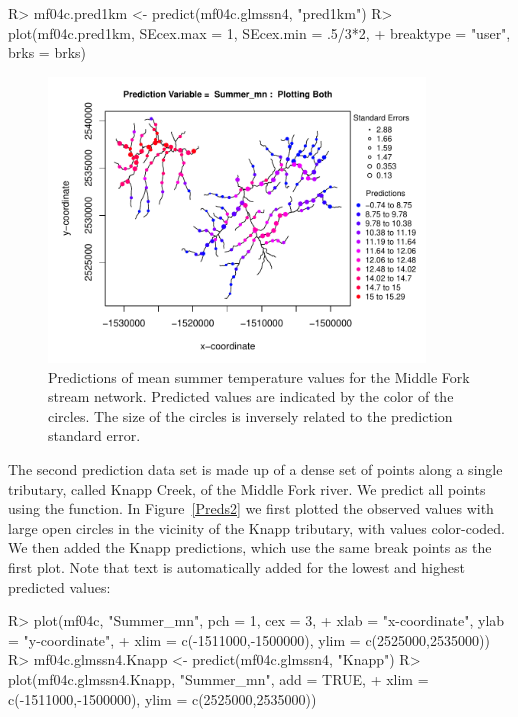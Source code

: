 \documentclass[nojss]{jss}
\renewenvironment{Schunk}{\vspace{\topsep}}{\vspace{\topsep}}
\begin{document}
\begin{Schunk}
\begin{Sinput}
R> mf04c.pred1km <- predict(mf04c.glmssn4, "pred1km")
R> plot(mf04c.pred1km, SEcex.max = 1, SEcex.min = .5/3*2,
+       breaktype = "user", brks = brks)
\end{Sinput}
\end{Schunk}

\begin{figure}[htbp]
  \begin{center}
    \includegraphics[keepaspectratio=true, width = 100mm]{Figures/jss984Fig-Preds1}
    \caption{Predictions of mean summer temperature values for the Middle Fork stream network. Predicted
      values are indicated by the color of the circles. The size of
      the circles is inversely related to the prediction standard
      error.}\label{Preds1}
  \end{center}
\end{figure}

The second prediction data set is made up of a dense set of points
along a single tributary, called Knapp Creek, of the Middle Fork
river. We predict all points using the  function. In
Figure~\ref{Preds2} we first plotted the observed values with large
open circles in the vicinity of the Knapp tributary, with values
color-coded. We then added the Knapp predictions, which use the same
break points as the first plot. Note that text is automatically added
for the lowest and highest predicted values:

\begin{Schunk}
\begin{Sinput}
R> plot(mf04c, "Summer_mn", pch = 1, cex = 3,
+     xlab = "x-coordinate", ylab = "y-coordinate",
+     xlim = c(-1511000,-1500000), ylim = c(2525000,2535000))
R> mf04c.glmssn4.Knapp <- predict(mf04c.glmssn4, "Knapp")
R> plot(mf04c.glmssn4.Knapp, "Summer_mn", add = TRUE,
+     xlim = c(-1511000,-1500000), ylim = c(2525000,2535000))
\end{Sinput}
\end{Schunk}
\end{document}
